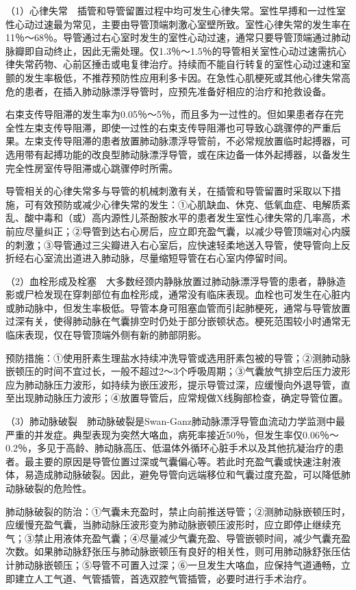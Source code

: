 （1）心律失常　插管和导管留置过程中均可发生心律失常。室性早搏和一过性室性心动过速最为常见，主要由导管顶端刺激心室壁所致。室性心律失常的发生率在11％～68％。导管通过右心室时发生的室性心动过速，通常只要导管顶端通过肺动脉瓣即自动终止，因此无需处理。仅1.3％～1.5％的导管相关室性心动过速需抗心律失常药物、心前区捶击或电复律治疗。持续而不能自行转复的室性心动过速和室颤的发生率极低，不推荐预防性应用利多卡因。在急性心肌梗死或其他心律失常高危的患者，在插入肺动脉漂浮导管时，应预先准备好相应的治疗和抢救设备。

右束支传导阻滞的发生率为0.05％～5％，而且多为一过性的。但如果患者存在完全性左束支传导阻滞，即使一过性的右束支传导阻滞也可导致心跳骤停的严重后果。左束支传导阻滞的患者放置肺动脉漂浮导管前，不必常规放置临时起搏器，可选用带有起搏功能的改良型肺动脉漂浮导管，或在床边备一体外起搏器，以备发生完全性房室传导阻滞或心跳骤停时所需。

导管相关的心律失常多与导管的机械刺激有关，在插管和导管留置时采取以下措施，可有效预防或减少心律失常的发生：①心肌缺血、休克、低氧血症、电解质紊乱、酸中毒和（或）高内源性儿茶酚胺水平的患者发生室性心律失常的几率高，术前应尽量纠正；②导管到达右心房后，应立即充盈气囊，以减少导管顶端对心内膜的刺激；③导管通过三尖瓣进入右心室后，应快速轻柔地送入导管，使导管向上反折经右心室流出道进入肺动脉，尽量缩短导管在右心室内停留时间。

（2）血栓形成及栓塞　大多数经颈内静脉放置过肺动脉漂浮导管的患者，静脉造影或尸检发现在穿刺部位有血栓形成，通常没有临床表现。血栓也可发生在心脏内或肺动脉中，但发生率极低。导管本身可阻塞血管而引起肺梗死，通常与导管放置过深有关，使得肺动脉在气囊排空时仍处于部分嵌顿状态。梗死范围较小时通常无临床表现，仅在导管顶端外侧有新的肺部阴影。

预防措施：①使用肝素生理盐水持续冲洗导管或选用肝素包被的导管；②测肺动脉嵌顿压的时间不宜过长，一般不超过2～3个呼吸周期；③气囊放气排空后压力波形应为肺动脉压力波形，如持续为嵌压波形，提示导管过深，应缓慢向外退导管，直至出现肺动脉压力波形；④放置导管后，应常规做X线胸部检查，确定导管位置。

（3）肺动脉破裂　肺动脉破裂是Swan-Ganz肺动脉漂浮导管血流动力学监测中最严重的并发症。典型表现为突然大咯血，病死率接近50％，但发生率仅0.06％～0.2％，多见于高龄、肺动脉高压、低温体外循环心脏手术以及其他抗凝治疗的患者。最主要的原因是导管位置过深或气囊偏心等。若此时充盈气囊或快速注射液体，易造成肺动脉破裂。因此，避免导管向远端移位和气囊过度充盈，可以降低肺动脉破裂的危险性。

肺动脉破裂的防治：①气囊未充盈时，禁止向前推送导管；②测肺动脉嵌顿压时，应缓慢充盈气囊，当肺动脉压波形变为肺动脉嵌顿压波形时，应立即停止继续充气；③禁止用液体充盈气囊；④尽量减少气囊充盈、导管嵌顿时间，减少气囊充盈次数。如果肺动脉舒张压与肺动脉嵌顿压有良好的相关性，则可用肺动脉舒张压估计肺动脉嵌顿压；⑤导管不可置入过深；⑥一旦发生大咯血，应保持气道通畅，立即建立人工气道、气管插管，首选双腔气管插管，必要时进行手术治疗。

